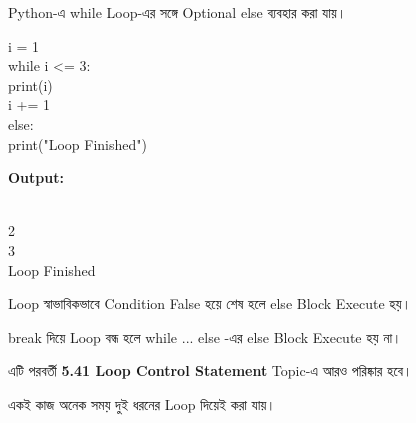 

Python-এ
\textenglish{\ttfamily while}
Loop-এর সঙ্গে Optional
\textenglish{\ttfamily else}
ব্যবহার করা যায়।

\begin{codebox}
\begin{english}
\ttfamily
i = 1\\[0.5mm]
while i <= 3:\\
\hspace*{4mm}print(i)\\
\hspace*{4mm}i += 1\\
else:\\
\hspace*{4mm}print("Loop Finished")
\end{english}
\end{codebox}

\textbf{Output:}

\begin{codebox}
\begin{english}
\\
2\\
3\\
Loop Finished
\end{english}
\end{codebox}

Loop স্বাভাবিকভাবে Condition
\textenglish{\ttfamily False}
হয়ে শেষ হলে
\textenglish{\ttfamily else}
Block Execute হয়।

\begin{rememberbox}

\textenglish{\ttfamily break}
দিয়ে Loop বন্ধ হলে
\textenglish{\ttfamily while ... else}
-এর
\textenglish{\ttfamily else}
Block Execute হয় না।

এটি পরবর্তী
\textbf{5.41 Loop Control Statement}
Topic-এ আরও পরিষ্কার হবে।

\end{rememberbox}



একই কাজ অনেক সময় দুই ধরনের Loop দিয়েই করা যায়।

